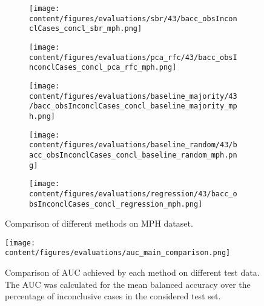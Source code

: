 \begin{figure}[t]
  \begin{subfigure}{0.5\textwidth}
    \centering
    \texttt{[image: content/figures/evaluations/sbr/43/bacc\_obsInconclCases\_concl\_sbr\_mph.png]}
  \end{subfigure}
  \hfill
  \begin{subfigure}{0.5\textwidth}
    \centering
    \texttt{[image: content/figures/evaluations/pca\_rfc/43/bacc\_obsInconclCases\_concl\_pca\_rfc\_mph.png]}
  \end{subfigure}
  \hfill
  \begin{subfigure}{0.5\textwidth}
    \centering
    \texttt{[image: content/figures/evaluations/baseline\_majority/43/bacc\_obsInconclCases\_concl\_baseline\_majority\_mph.png]}
  \end{subfigure}
  \hfill
  \begin{subfigure}{0.5\textwidth}
    \centering
    \texttt{[image: content/figures/evaluations/baseline\_random/43/bacc\_obsInconclCases\_concl\_baseline\_random\_mph.png]}
  \end{subfigure}
  \hfill
  \begin{subfigure}{0.5\textwidth}
    \centering
    \texttt{[image: content/figures/evaluations/regression/43/bacc\_obsInconclCases\_concl\_regression\_mph.png]}
  \end{subfigure}

  \caption{Comparison of different methods on MPH dataset.}
  \label{fig:test_mph}
\end{figure}



\begin{figure}[h]
  \centering
  \texttt{[image: content/figures/evaluations/auc\_main\_comparison.png]}
  \caption{Comparison of AUC achieved by each method on different test data. 
  The AUC was calculated for the mean balanced accuracy over the percentage of inconclusive cases 
  in the considered test set.} 
  \label{fig:auc_comparison_methods_data}
\end{figure} 